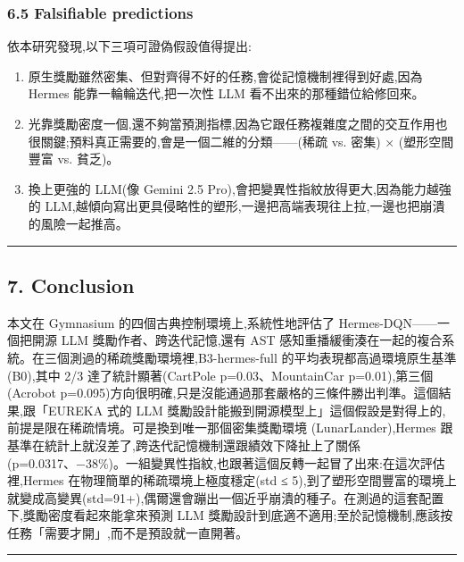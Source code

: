 \subsubsection{6.5 Falsifiable predictions}\label{65-falsifiable-predictions}

依本研究發現,以下三項可證偽假設值得提出:

\begin{enumerate}
\def\labelenumi{\arabic{enumi}.}
\tightlist
\item
  原生獎勵雖然密集、但對齊得不好的任務,會從記憶機制裡得到好處,因為 Hermes 能靠一輪輪迭代,把一次性 LLM 看不出來的那種錯位給修回來。
\item
  光靠獎勵密度一個,還不夠當預測指標,因為它跟任務複雜度之間的交互作用也很關鍵;預料真正需要的,會是一個二維的分類------(稀疏 vs. 密集) × (塑形空間豐富 vs. 貧乏)。
\item
  換上更強的 LLM(像 Gemini 2.5 Pro),會把變異性指紋放得更大,因為能力越強的 LLM,越傾向寫出更具侵略性的塑形,一邊把高端表現往上拉,一邊也把崩潰的風險一起推高。
\end{enumerate}

\begin{center}\rule{0.5\linewidth}{0.5pt}\end{center}

\subsection{7. Conclusion}\label{7-conclusion}

本文在 Gymnasium 的四個古典控制環境上,系統性地評估了 Hermes-DQN------一個把開源 LLM 獎勵作者、跨迭代記憶,還有 AST 感知重播緩衝湊在一起的複合系統。在三個測過的稀疏獎勵環境裡,B3-hermes-full 的平均表現都高過環境原生基準 (B0),其中 2/3 達了統計顯著(CartPole p=0.03、MountainCar p=0.01),第三個(Acrobot p=0.095)方向很明確,只是沒能通過那套嚴格的三條件勝出判準。這個結果,跟「EUREKA 式的 LLM 獎勵設計能搬到開源模型上」這個假設是對得上的,前提是限在稀疏情境。可是換到唯一那個密集獎勵環境 (LunarLander),Hermes 跟基準在統計上就沒差了,跨迭代記憶機制還跟績效下降扯上了關係(p=0.0317、−38\%)。一組變異性指紋,也跟著這個反轉一起冒了出來:在這次評估裡,Hermes 在物理簡單的稀疏環境上極度穩定(std ≤ 5),到了塑形空間豐富的環境上就變成高變異(std=91+),偶爾還會蹦出一個近乎崩潰的種子。在測過的這套配置下,獎勵密度看起來能拿來預測 LLM 獎勵設計到底適不適用;至於記憶機制,應該按任務「需要才開」,而不是預設就一直開著。

\begin{center}\rule{0.5\linewidth}{0.5pt}\end{center}

